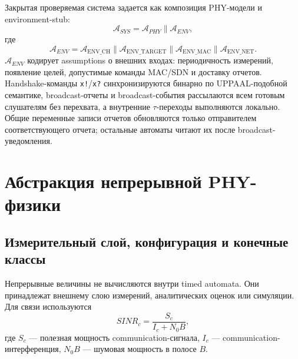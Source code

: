 \documentclass[10pt,a4paper]{article}
\newcommand{\code}[1]{\texttt{#1}}
\newcommand{\A}[1]{\mathcal{A}_{#1}}
\begin{document}
Закрытая проверяемая система задается как композиция PHY-модели и environment-stub:
\begin{equation}
\A{SYS}=\A{PHY}\parallel\A{ENV},
\end{equation}
где
\begin{equation}
\A{ENV}=
\mathcal{A}_{\text{ENV\_CH}}\parallel
\mathcal{A}_{\text{ENV\_TARGET}}\parallel
\mathcal{A}_{\text{ENV\_MAC}}\parallel
\mathcal{A}_{\text{ENV\_NET}}.
\end{equation}
\(\A{ENV}\) кодирует assumptions о внешних входах: периодичность измерений, появление целей, допустимые команды MAC/SDN и доставку отчетов. Handshake-команды \code{x!}/\code{x?} синхронизируются бинарно по UPPAAL-подобной семантике, broadcast-отчеты и broadcast-события рассылаются всем готовым слушателям без перехвата, а внутренние \(\tau\)-переходы выполняются локально. Общие переменные записи отчетов обновляются только отправителем соответствующего отчета; остальные автоматы читают их после broadcast-уведомления.

\section{Абстракция непрерывной PHY-физики}

\subsection{Измерительный слой, конфигурация и конечные классы}

Непрерывные величины не вычисляются внутри timed automata. Они принадлежат внешнему слою измерений, аналитических оценок или симуляции. Для связи используются
\begin{equation}
SINR_c=\frac{S_c}{I_c+N_0B},
\end{equation}
где \(S_c\) --- полезная мощность communication-сигнала, \(I_c\) --- communication-интерференция, \(N_0B\) --- шумовая мощность в полосе \(B\).
\end{document}
